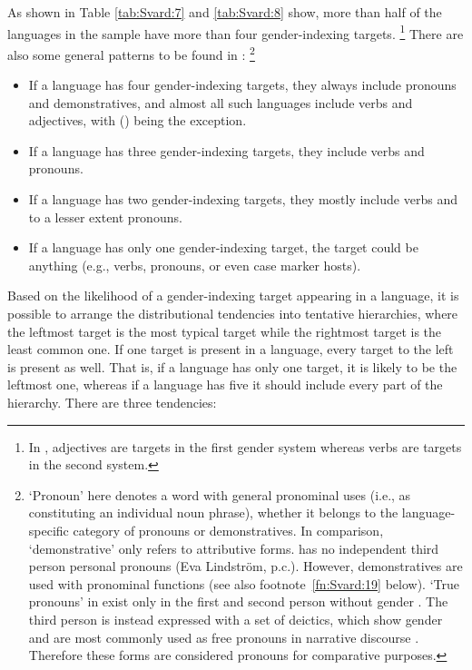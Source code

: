 \documentclass[output=collectionpaper]{langsci/langscibook}
\begin{document}
As shown in Table \ref{tab:Svard:7} and \ref{tab:Svard:8} show, more than half of the languages in the sample have more than four gender-indexing targets.%
\footnote{%
In , adjectives are targets in the first gender system whereas verbs are targets in the second system.
} %
There are also some general patterns to be found in :%
\footnote{%
`Pronoun' here denotes a word with general pronominal uses (i.e., as constituting an individual noun phrase), whether it belongs to the language-specific category of pronouns or demonstratives. In comparison, `demonstrative' only refers to attributive forms.  has no independent third person personal pronouns (Eva Lindström, p.c.). However, demonstratives are used with pronominal functions (see also footnote~\ref{fn:Svard:19} below). `True pronouns' in  exist only in the first and second person without gender \citep[111]{Foley1991}. The third person is instead expressed with a set of deictics, which show gender and are most commonly used as free pronouns in narrative discourse \citep[113]{Foley1991}. Therefore these forms are considered pronouns for comparative purposes.
}%

\begin{itemize}
\item If a language has four gender-indexing targets, they always include pronouns and demonstratives, and almost all such languages include verbs and adjectives, with  () being the exception.
\item If a language has three gender-indexing targets, they include verbs and pronouns.
\item If a language has two gender-indexing targets, they mostly include verbs and to a lesser extent pronouns.
\item If a language has only one gender-indexing target, the target could be anything (e.g., verbs, pronouns, or even case marker hosts).
\end{itemize}

Based on the likelihood of a gender-indexing target appearing in a language, it is possible to arrange the distributional tendencies into tentative hierarchies, where the leftmost target is the most typical target while the rightmost target is the least common one. If one target is present in a language, every target to the left is present as well. That is, if a language has only one target, it is likely to be the leftmost one, whereas if a language has five it should include every part of the hierarchy. There are three tendencies:
\end{document}
